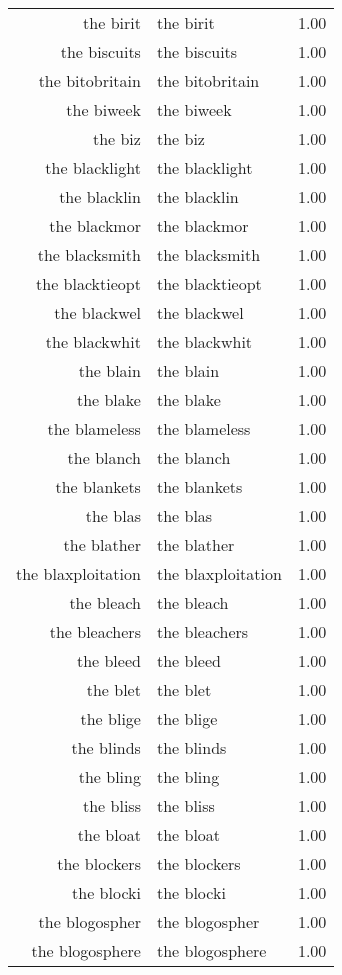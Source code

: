 \begin{table}[ht]
\begin{tabular}{rlr}
  the birit & the birit & 1.00 \\ 
  the biscuits & the biscuits & 1.00 \\ 
  the bitobritain & the bitobritain & 1.00 \\ 
  the biweek & the biweek & 1.00 \\ 
  the biz & the biz & 1.00 \\ 
  the blacklight & the blacklight & 1.00 \\ 
  the blacklin & the blacklin & 1.00 \\ 
  the blackmor & the blackmor & 1.00 \\ 
  the blacksmith & the blacksmith & 1.00 \\ 
  the blacktieopt & the blacktieopt & 1.00 \\ 
  the blackwel & the blackwel & 1.00 \\ 
  the blackwhit & the blackwhit & 1.00 \\ 
  the blain & the blain & 1.00 \\ 
  the blake & the blake & 1.00 \\ 
  the blameless & the blameless & 1.00 \\ 
  the blanch & the blanch & 1.00 \\ 
  the blankets & the blankets & 1.00 \\ 
  the blas & the blas & 1.00 \\ 
  the blather & the blather & 1.00 \\ 
  the blaxploitation & the blaxploitation & 1.00 \\ 
  the bleach & the bleach & 1.00 \\ 
  the bleachers & the bleachers & 1.00 \\ 
  the bleed & the bleed & 1.00 \\ 
  the blet & the blet & 1.00 \\ 
  the blige & the blige & 1.00 \\ 
  the blinds & the blinds & 1.00 \\ 
  the bling & the bling & 1.00 \\ 
  the bliss & the bliss & 1.00 \\ 
  the bloat & the bloat & 1.00 \\ 
  the blockers & the blockers & 1.00 \\ 
  the blocki & the blocki & 1.00 \\ 
  the blogospher & the blogospher & 1.00 \\ 
  the blogosphere & the blogosphere & 1.00 \\ 

\end{tabular}
\end{table}
